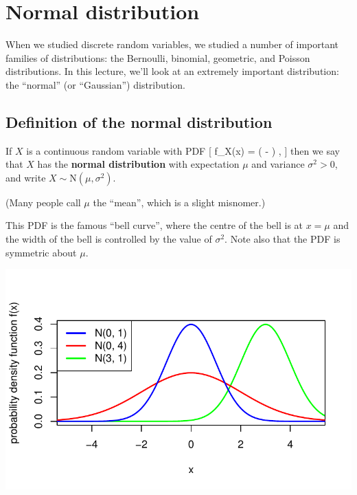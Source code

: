 \documentclass[
  letterpaper,
]{report}
\theoremstyle{definition}
\theoremstyle{definition}
\theoremstyle{remark}
\begin{document}
\hypertarget{L16-normal}{%
\chapter{Normal distribution}\label{L16-normal}}

When we studied discrete random variables, we studied a number of
important families of distributions: the Bernoulli, binomial, geometric,
and Poisson distributions. In this lecture, we'll look at an extremely
important distribution: the ``normal'' (or ``Gaussian'') distribution.

\hypertarget{normal-definition}{%
\section{Definition of the normal
distribution}\label{normal-definition}}

If \(X\) is a continuous random variable with PDF {[} f\_X(x) =
 \exp \left( -
 \right) , {]} then we say that \(X\) has
the \textbf{normal distribution} with expectation \(\mu\) and variance
\(\sigma^2 > 0\), and write \(X \sim \mathrm N(\mu,\sigma^2)\).

(Many people call \(\mu\) the ``mean'', which is a slight misnomer.)

This PDF is the famous ``bell curve'', where the centre of the bell is
at \(x = \mu\) and the width of the bell is controlled by the value of
\(\sigma^2\). Note also that the PDF is symmetric about \(\mu\).

\includegraphics{sections/L17-normal_files/figure-pdf/norm-pic-1-1.pdf}
\end{document}
